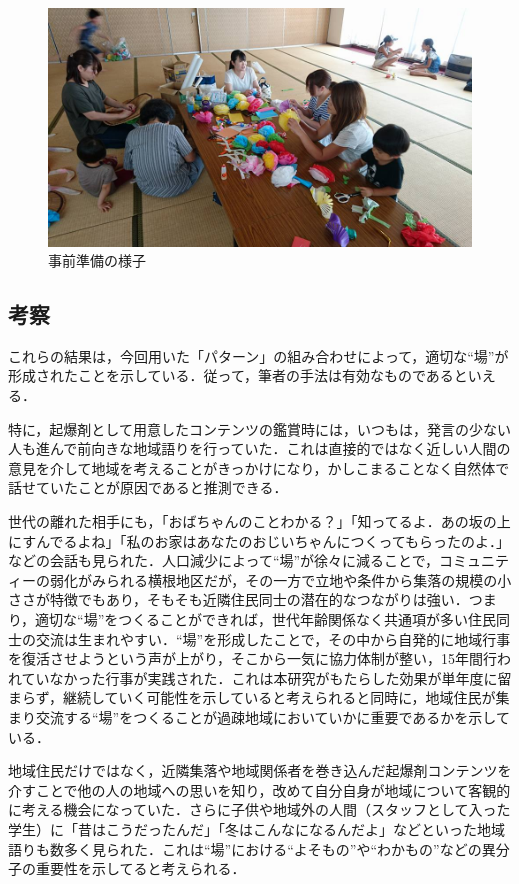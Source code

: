 \documentclass[a4paper]{jsarticle}
\begin{document}
\begin{figure}[H]
  \begin{center}
    \includegraphics[width=0.6\hsize]{./images/24.jpg}
    \caption{事前準備の様子}
    \label{fig:tmu_hino}
  \end{center}
\end{figure}


\subsection{考察}
これらの結果は，今回用いた「パターン」の組み合わせによって，適切な“場”が形成されたことを示している．従って，筆者の手法は有効なものであるといえる．\par
特に，起爆剤として用意したコンテンツの鑑賞時には，いつもは，発言の少ない人も進んで前向きな地域語りを行っていた．これは直接的ではなく近しい人間の意見を介して地域を考えることがきっかけになり，かしこまることなく自然体で話せていたことが原因であると推測できる．
\par
世代の離れた相手にも，「おばちゃんのことわかる？」「知ってるよ．あの坂の上にすんでるよね」「私のお家はあなたのおじいちゃんにつくってもらったのよ．」などの会話も見られた．人口減少によって“場”が徐々に減ることで，コミュニティーの弱化がみられる横根地区だが，その一方で立地や条件から集落の規模の小ささが特徴でもあり，そもそも近隣住民同士の潜在的なつながりは強い．つまり，適切な“場”をつくることができれば，世代年齢関係なく共通項が多い住民同士の交流は生まれやすい．“場”を形成したことで，その中から自発的に地域行事を復活させようという声が上がり，そこから一気に協力体制が整い，15年間行われていなかった行事が実践された．これは本研究がもたらした効果が単年度に留まらず，継続していく可能性を示していると考えられると同時に，地域住民が集まり交流する“場”をつくることが過疎地域においていかに重要であるかを示している．\par
地域住民だけではなく，近隣集落や地域関係者を巻き込んだ起爆剤コンテンツを介すことで他の人の地域への思いを知り，改めて自分自身が地域について客観的に考える機会になっていた．さらに子供や地域外の人間（スタッフとして入った学生）に「昔はこうだったんだ」「冬はこんなになるんだよ」などといった地域語りも数多く見られた．これは“場”における“よそもの”や“わかもの”などの異分子の重要性を示してると考えられる．\par
\end{document}
